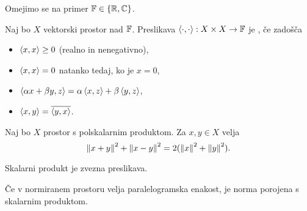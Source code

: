 
Omejimo se na primer $\mathbb{F} \in \{\mathbb{R}, \mathbb{C}\}$.

\begin{definicija}
  Naj bo $X$ vektorski prostor nad $\mathbb{F}$.
  Preslikava $\left< \cdot, \cdot \right> : X \times X \to \mathbb{F}$ je , če zadošča
  \begin{itemize}
  \item $\left< x,x \right> \ge 0$ (realno in nenegativno),
  \item $\left< x,x \right> = 0$ natanko tedaj, ko je $x = 0$,
  \item $\left< \alpha x + \beta y, z \right> = \alpha \left< x,z \right> + \beta \left< y,z \right>$,
  \item $\left< x,y \right> = \overline{\left< y,x \right>}$.
  \end{itemize}
\end{definicija}

\begin{trditev}
  Naj bo $X$ prostor s polskalarnim produktom.
  Za $x, y \in X$ velja
  \[
	\left\lVert x+y\right\rVert^2 + \left\lVert x-y\right\rVert^2 = 2 (\left\lVert x\right\rVert^2 + \left\lVert y\right\rVert^2).
  \]
\end{trditev}

\begin{trditev}
  Skalarni produkt je zvezna preslikava.
\end{trditev}

\begin{izrek}
  Če v normiranem prostoru velja paralelogramska enakost, je norma porojena s
  skalarnim produktom.
\end{izrek}

